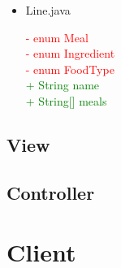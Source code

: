 \documentclass[a4paper]{scrreprt}
\begin{document}
\begin{itemize}

\item{Line.java}

\textcolor{red}{- enum Meal} \\
\textcolor{red}{- enum Ingredient} \\
\textcolor{red}{- enum FoodType} \\
\textcolor{green}{+ String name} \\
\textcolor{green}{+ String[] meals}\\




\end{itemize}

\subsection{View}
\subsection{Controller}





\section{Client}





\printglossaries
\end{document}
